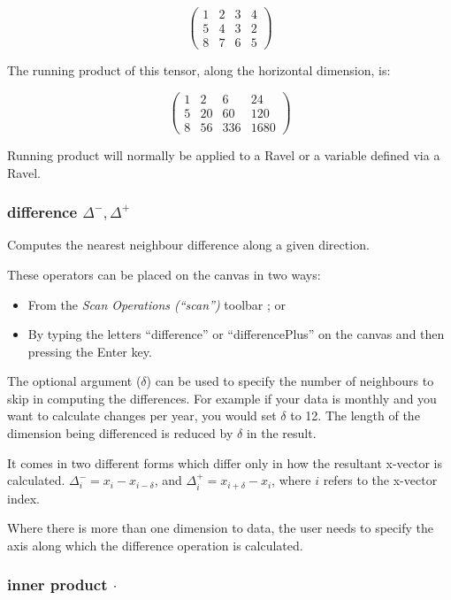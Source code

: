 \[
\left(\begin{array}{cccc}
1 & 2 & 3 & 4\\
5 & 4 & 3 & 2\\
8 & 7 & 6 & 5
\end{array}\right)
\]

The running product of this tensor, along the horizontal dimension,
is:

\[
\left(\begin{array}{cccc}
1 & 2 & 6 & 24\\
5 & 20 & 60 & 120\\
8 & 56 & 336 & 1680
\end{array}\right)
\]

Running product will normally be applied to a Ravel or a variable
defined via a Ravel.

\subsubsection{difference $\Delta^{-},\Delta^{+}$}

\label{Operation:difference}\label{Operation:differencePlus} Computes
the nearest neighbour difference along a given direction.


These operators can be placed on the canvas in two ways:
\begin{itemize}
\item From the \emph{Scan Operations (``scan'')} toolbar ;
or 
\item By typing the letters ``difference'' or ``differencePlus''
on the canvas and then pressing the Enter key.
\end{itemize}
The optional argument ($\delta$) can be used to specify the number
of neighbours to skip in computing the differences. For example if
your data is monthly and you want to calculate changes per year, you
would set $\delta$ to 12. The length of the dimension being differenced
is reduced by $\delta$ in the result.

It comes in two different forms which differ only in how the resultant
x-vector is calculated. $\Delta_{i}^{-}=x_{i}-x_{i-\delta}$, and
$\Delta_{i}^{+}=x_{i+\delta}-x_{i}$, where $i$ refers to the x-vector
index.

Where there is more than one dimension to data, the user needs to
specify the axis along which the difference operation is calculated.

\subsubsection{inner product $\cdot$}


